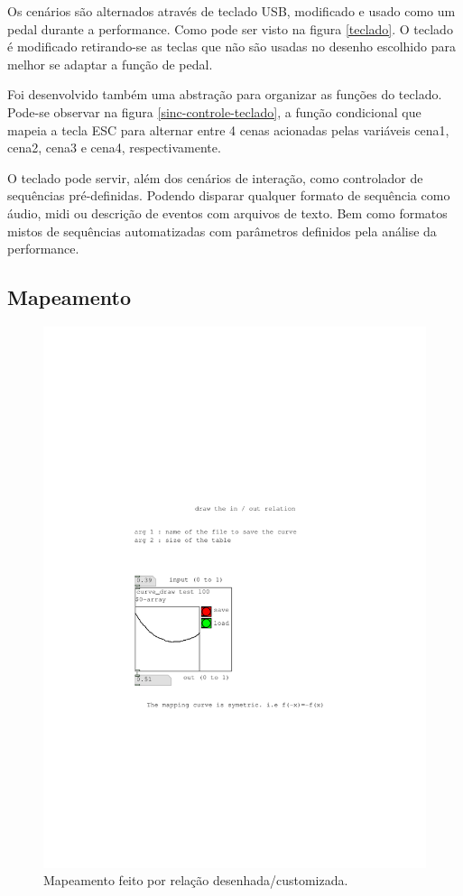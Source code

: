 \documentclass[draft]{ppgmus}
\begin{document}
Os cenários são alternados através de teclado USB, modificado e usado como
um pedal durante a performance. Como pode ser visto na figura \ref{teclado}.
O teclado é modificado retirando-se as teclas que não são usadas no desenho escolhido
para melhor se adaptar a função de pedal.

Foi desenvolvido também uma abstração para organizar as funções do teclado.
Pode-se observar na figura \ref{sinc-controle-teclado}, a função condicional
que mapeia a tecla ESC para alternar entre 4 cenas acionadas pelas variáveis
cena1, cena2, cena3 e cena4, respectivamente.

O teclado pode servir, além dos cenários de interação, como controlador
de sequências pré-definidas. Podendo disparar qualquer formato de sequência como
áudio, midi ou descrição de eventos com arquivos de texto. Bem como formatos mistos
de sequências automatizadas com parâmetros definidos pela análise da performance.


\subsection{Mapeamento}


\begin{figure}
\includegraphics[scale=.6]{mapping1}
\caption{Mapeamento feito por relação desenhada/customizada.}
\label{mapping1}
\end{figure}
\end{document}

